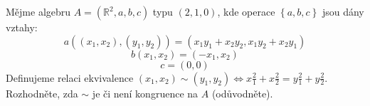 Mějme algebru $A=\left ( \mathbb{R}^{2},a,b,c \right )$ typu $(2,1,0)$, kde
operace $\left \{ a,b,c \right \}$ jsou dány vztahy:
$$a((x_{1},x_{2}),(y_{1},y_{2})) =
(x_{1}y_{1}+x_{2}y_{2},x_{1}y_{2}+x_{2}y_{1})$$
$$b(x_{1},x_{2}) = (-x_{1},x_{2})$$
$$c=(0,0)$$
Definujeme relaci ekvivalence $(x_{1},x_{2}) \sim (y_{1},y_{2}) \Leftrightarrow
x\tfrac{2}{1}+x\tfrac{2}{2}=y\tfrac{2}{1}+y\tfrac{2}{2}$. Rozhodněte, zda $\sim$
je či není kongruence na $A$ (odůvodněte).

